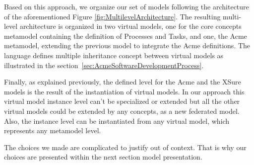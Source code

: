 Based on this approach, we organize our set of models following the architecture of the aforementioned Figure \ref{fig:MultilevelArchitecture}. The resulting multi-level architecture is organized in two virtual models, one for the core concepts metamodel containing the definition of Processes and Tasks, and one, the Acme metamodel, extending the previous model to integrate the Acme definitions. The \FML language defines multiple inheritance concept between virtual models as illustrated in the section~\ref{sec:AcmeSoftwareDevelopmentProcess}.

Finally, as explained previously, the defined level for the Acme  and the XSure models is the result of the instantiation of virtual models. In our approach this virtual model instance level can't be specialized or extended but all the other virtual models could be extended by any concepts, as a new federated model.
Also, the instance level can be instantiated from any virtual model, which represents any metamodel level.




The choices we made are complicated to justify out of context. That is why our choices are presented within the next section model presentation.



